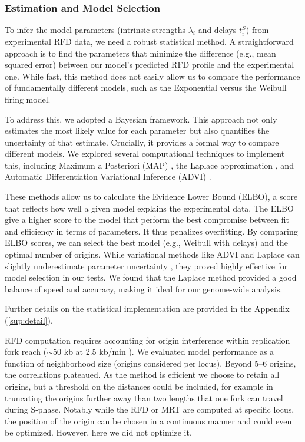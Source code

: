 \documentclass[10pt,a4paper]{revtex4-2}
\begin{document}
\subsubsection{Estimation and Model Selection}

To infer the model parameters (intrinsic strengths $\lambda_i$ and delays $t_i^S$) from experimental RFD data, we need a robust statistical method. A straightforward approach is to find the parameters that minimize the difference (e.g., mean squared error) between our model's predicted RFD profile and the experimental one. While fast, this method does not easily allow us to compare the performance of fundamentally different models, such as the Exponential versus the Weibull firing model.

To address this, we adopted a Bayesian framework. 
This approach not only estimates the most likely value for each parameter but also quantifies the 
uncertainty of that estimate. Crucially, it provides a formal way to compare different models. 
We explored several computational techniques to implement this, including Maximum a Posteriori (MAP) \cite{Bishop2006}, 
the Laplace approximation \cite{Bishop2006,MacKay2003}, and Automatic Differentiation Variational Inference (ADVI) \cite{Kucukelbir2017}.

These methods allow us to calculate the Evidence Lower Bound (ELBO), 
a score that reflects how well a given model explains the experimental data. 
The ELBO give a higher score to the model that perform the best compromise between fit and efficiency in terms of parameters.
It thus penalizes overfitting.
By comparing ELBO scores, we can select the best model (e.g., Weibull with delays) and the optimal number of origins.
While variational methods like ADVI and Laplace can slightly underestimate parameter uncertainty \cite{Blei2017}, 
they proved highly effective for model selection in our tests. 
We found that the Laplace method provided a good balance of speed and accuracy, making it ideal for our genome-wide analysis. 

Further details on the statistical implementation are provided in the Appendix (\ref{sup:detail}).

RFD computation requires accounting for origin interference within replication fork reach 
($\sim$50 kb at 2.5 kb/min \cite{Theulot2022}). 
We evaluated model performance as a function of neighborhood size (origins considered per locus). 
Beyond 5–6 origins, the correlations plateaued. 
As the method is efficient we choose to retain all origins, but a threshold on the distances could be included, for example in truncating the origins
further away than two lengths that one fork can travel during S-phase.
Notably while the RFD or MRT are computed at specific locus, the position of the origin can be chosen in a continuous manner and could even be optimized. However, here we did not optimize it.
\end{document}
